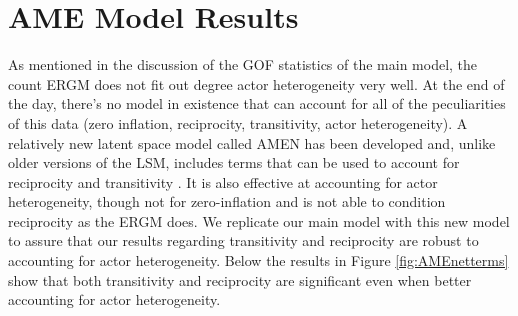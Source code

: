 \documentclass[reqno,onecolumn,letterpaper,12pt]{article}
\begin{document}
\section{AME Model Results}\label{AMEresults}

As mentioned in the discussion of the GOF statistics of the main model, the count ERGM does not fit out degree actor heterogeneity very well. At the end of the day, there's no model in existence that can account for all of the peculiarities of this data (zero inflation, reciprocity, transitivity, actor heterogeneity). A relatively new latent space model called AMEN has been developed and, unlike older versions of the LSM, includes terms that can be used to account for reciprocity and transitivity \citep{minhas2019inferential}. It is also effective at accounting for actor heterogeneity, though not for zero-inflation and is not able to condition reciprocity as the ERGM does. We replicate our main model with this new model to assure that our results regarding transitivity and reciprocity are robust to accounting for actor heterogeneity. Below the results in Figure \ref{fig:AMEnetterms} show that both transitivity and reciprocity are significant even when better accounting for actor heterogeneity.\\
\end{document}
